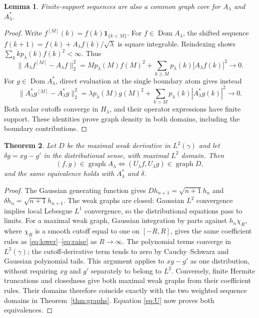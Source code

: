 \documentclass[11pt]{article}
\newtheorem{theorem}{Theorem}[section]
\newtheorem{lemma}[theorem]{Lemma}
\newcommand{\Dom}{\operatorname{Dom}}
\begin{document}
\begin{lemma}\label{lem:finitecore}
Finite-support sequences are also a common graph core for
$A_\lambda$ and $A_\lambda^*$.
\end{lemma}
\begin{proof}
Write $f^{[M]}(k)=f(k)\mathbf1_{\{k<M\}}$. For
$f\in\Dom A_\lambda$, the shifted sequence
$f(k+1)=f(k)+A_\lambda f(k)/\sqrt\lambda$ is square integrable.
Reindexing shows $\sum_k k p_\lambda(k)f(k)^2<\infty$. Thus
\[
 \|A_\lambda f^{[M]}-A_\lambda f\|_2^2
 =M p_\lambda(M)f(M)^2+
 \sum_{k\geq M}p_\lambda(k)|A_\lambda f(k)|^2\longrightarrow0.
\]
For $g\in\Dom A_\lambda^*$, direct evaluation at the single boundary
atom gives instead
\[
 \|A_\lambda^*g^{[M]}-A_\lambda^*g\|_2^2
 =\lambda p_\lambda(M)g(M)^2+
 \sum_{k>M}p_\lambda(k)|A_\lambda^*g(k)|^2\longrightarrow0.
\]
Both scalar cutoffs converge in $H_\lambda$, and their operator
expressions have finite support. These identities prove graph density
in both domains, including the boundary contributions.
\end{proof}

\begin{theorem}\label{thm:transport}
Let $D$ be the maximal weak derivative in $L^2(\gamma)$ and let
$\delta g=xg-g'$ in the distributional sense, with maximal $L^2$
domain. Then
\[
 (f,g)\in\operatorname{graph} A_\lambda
 \iff (U_\lambda f,U_\lambda g)\in\operatorname{graph} D,
\]
and the same equivalence holds with $A_\lambda^*$ and $\delta$.
\end{theorem}
\begin{proof}
The Gaussian generating function gives $Dh_{n+1}=\sqrt{n+1}h_n$
and $\delta h_n=\sqrt{n+1}h_{n+1}$. The weak graphs are closed:
Gaussian $L^2$ convergence implies local Lebesgue $L^1$ convergence,
so the distributional equations pass to limits. For a maximal weak
graph, Gaussian integration by parts against $h_n\chi_R$, where
$\chi_R$ is a smooth cutoff equal to one on $[-R,R]$, gives the same
coefficient rules as \eqref{eq:lower}--\eqref{eq:raise} as $R\to\infty$.
The polynomial terms converge in $L^2(\gamma)$; the cutoff-derivative
term tends to zero by Cauchy--Schwarz and Gaussian polynomial tails.
This argument applies to $xg-g'$ as one distribution, without requiring
$xg$ and $g'$ separately to belong to $L^2$. Conversely, finite Hermite
truncations and closedness give both maximal weak graphs from their
coefficient rules. Their domains therefore coincide exactly with the
two weighted sequence domains in Theorem~\ref{thm:graphs}. Equation
\eqref{eq:U} now proves both equivalences.
\end{proof}
\end{document}

